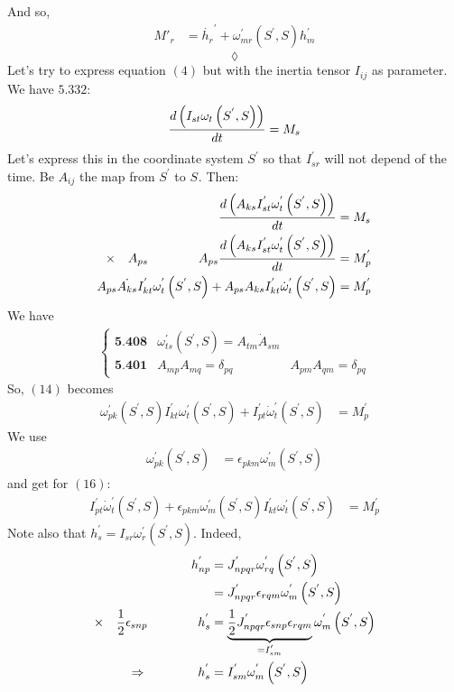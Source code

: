 And so, 
\begin{align}
M{'}_{r}&=\dot{h_{r}}^{'}+\omega^{'}_{mr}\left(S^{'},S\right)h^{'}_{m}
\end{align}
$$\lozenge$$
Let's try to express equation $(4)$ but with the inertia tensor $I_{ij}$ as parameter.
We have $\mathbf{5.332}$:
\begin{align}
\dv{\left(I_{st}\omega_t\left(S^{'},S\right)\right)}{t} = M_s
\end{align}
Let's express this in the coordinate system $S^{'}$ so that $I^{'}_{sr}$ will not depend of the time. Be $A_{ij}$ the map from $S^{'}$ to $S^{}$. Then:
\begin{align}
\dv{\left(A_{ks}I^{'}_{st}\omega^{'}_t\left(S^{'},S\right)\right)}{t} &= M_s\\
\times\quad A_{ps}\quad\quad\quad\quad A_{ps}\dv{\left(A_{ks}I^{'}_{st}\omega^{'}_t\left(S^{'},S\right)\right)}{t} &= M^{'}_p\\
A_{ps}\dot{A_{ks}}I^{'}_{kt}\omega^{'}_t\left(S^{'},S\right) + A_{ps}A_{ks}I^{'}_{kt}\dot{\omega}^{'}_t\left(S^{'},S\right)&= M^{'}_p
\end{align}
We have
\begin{align}
\left\{\begin{array}{lll}
\textbf{5.408}&\omega^{'}_{ts}\left(S^{'},S\right)= A_{tm}\dot{A}_{sm}&\\
\textbf{5.401}& A_{mp}A_{mq}= \delta_{pq}& A_{pm}A_{qm}= \delta_{pq}
\end{array}\right.
\end{align}
So, $(14)$ becomes 
\begin{align}
\omega^{'}_{pk}\left(S^{'},S\right)I^{'}_{kt}\omega^{'}_t\left(S^{'},S\right)+I^{'}_{pt}\dot{\omega}^{'}_t\left(S^{'},S\right)&= M^{'}_p
\end{align}
We use 
\begin{align}
\omega^{'}_{pk}\left(S^{'},S\right) &= \epsilon_{pkm}\omega^{'}_{m}\left(S^{'},S\right)
\end{align}
and get for $(16)$:
\begin{align}
I^{'}_{pt}\dot{\omega}^{'}_t\left(S^{'},S\right)+\epsilon_{pkm}\omega^{'}_{m}\left(S^{'},S\right)I^{'}_{kt}\omega^{'}_t\left(S^{'},S\right)&= M^{'}_p
\end{align}
Note also that $h^{'}_s =I_{sr}\omega^{'}_{r}\left(S^{'},S\right)$. Indeed,
\begin{align}
h^{'}_{np} &=J^{'}_{npqr}\omega^{'}_{rq}\left(S^{'},S\right)\\
&= J^{'}_{npqr}\epsilon_{rqm}\omega^{'}_{m}\left(S^{'},S\right)\\
\times\quad\frac{1}{2}\epsilon_{snp}\quad\quad\quad\quad h^{'}_{s} &= \underbrace{\frac{1}{2} J^{'}_{npqr}\epsilon_{snp}\epsilon_{rqm}}_{=I_{sm}^{'}}\omega^{'}_{m}\left(S^{'},S\right)\\
\Rightarrow\quad\quad\quad\quad h^{'}_{s} &=I_{sm}^{'}\omega^{'}_{m}\left(S^{'},S\right)
\end{align}
